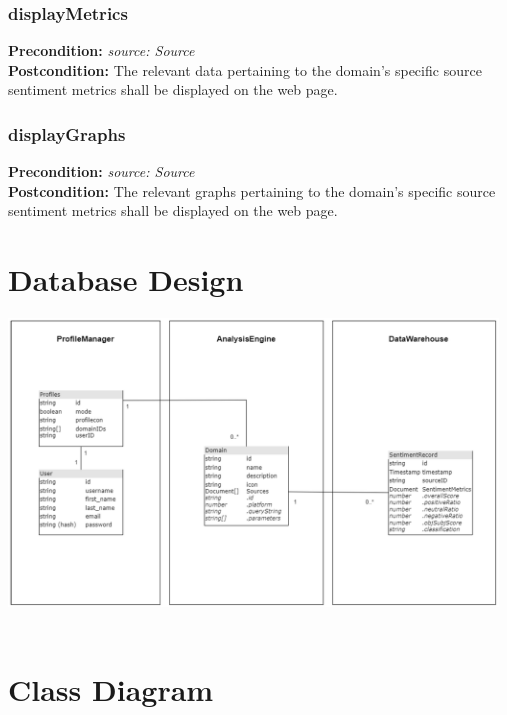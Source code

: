\documentclass[12pt]{article}
\begin{document}
\subsubsection*{displayMetrics}
\textbf{Precondition:} \textit{source: Source} \\
\textbf{Postcondition:} The relevant data pertaining to the domain's specific source sentiment metrics shall be displayed on the web page.

\subsubsection*{displayGraphs}
\textbf{Precondition:} \textit{source: Source} \\
\textbf{Postcondition:} The relevant graphs pertaining to the domain's specific source sentiment metrics shall be displayed on the web page.


\newpage

\section{Database Design}

\includegraphics[width=13cm]{../../Images/databaseDesignPic.png}\\\\

\newpage

\section{Class Diagram}
\end{document}
